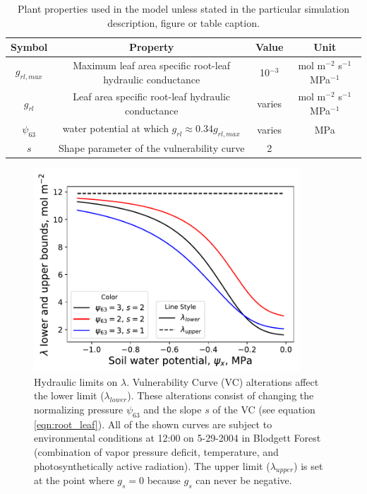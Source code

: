 \documentclass[utf8]{frontiersSCNS} %
\begin{document}
\begin{table}[]
    \centering
    \begin{tabular}{c|c|c|c}
        Symbol & Property & Value & Unit \\
        \hline
        $g_{rl,max}$ & Maximum leaf area specific root-leaf hydraulic conductance & 10$^{-3}$ & mol m$^{-2}$ s$^{-1}$ MPa$^{-1}$ \\
        $g_{rl}$ & Leaf area specific root-leaf hydraulic conductance & varies & mol m$^{-2}$ s$^{-1}$ MPa$^{-1}$ \\
        $\psi_{63}$ & water potential at which $g_{rl} \approx 0.34 g_{rl,max}$ & varies & MPa \\
        $s$ & Shape parameter of the vulnerability curve & 2 &  \\
    \end{tabular}
    \caption{Plant properties used in the model unless stated in the particular simulation description, figure or table caption.}
    \label{tab:plant_props}
\end{table}
\begin{figure}[t]
    \begin{center}
        \includegraphics[width=10cm]{Fig2.pdf}
    \end{center}
    \caption{Hydraulic limits on $\lambda$. Vulnerability Curve (VC) alterations affect the lower limit ($\lambda_{lower}$). These alterations consist of changing the normalizing pressure $\psi_{63}$ and the slope $s$ of the VC (see equation \ref{eqn:root_leaf}). All of the shown curves are subject to environmental conditions at 12:00 on 5-29-2004 in Blodgett Forest (combination of vapor pressure deficit, temperature, and photosynthetically active radiation). The upper limit ($\lambda_{upper}$) is set at the point where $g_s=0$ because $g_s$ can never be negative.}
    \label{fig:lam_lower}
\end{figure}
\end{document}
